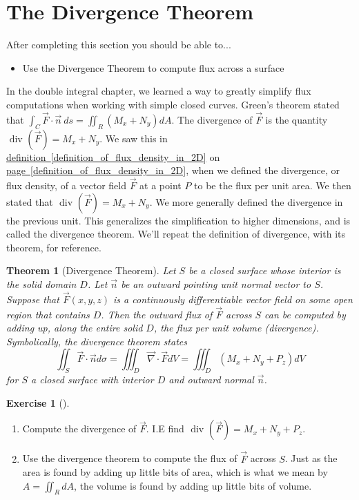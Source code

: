 \documentclass[10pt,]{book}
\theoremstyle{plain}
\newtheorem{theorem}{Theorem}[section]
\theoremstyle{definition}
\theoremstyle{definition}
\theoremstyle{definition}
\theoremstyle{definition}
\newtheorem{exploration}[project]{Exercise}
\theoremstyle{definition}
\numberwithin{equation}{section}
\begin{document}
\section[{The Divergence Theorem}]{The Divergence Theorem}\label{section-47}
After completing this section you should be able to... \leavevmode%
\begin{itemize}[label=\textbullet]
\item{}Use the Divergence Theorem to compute flux across a surface%
\end{itemize}
%
\par
In the double integral chapter, we learned a way to greatly simplify flux computations when working with simple closed curves. Green's theorem stated that \(\int_C \vec F\cdot \vec n\ ds = \iint_R (M_x+N_y) dA\). The divergence of \(\vec F\) is the quantity \(\text{ div } (\vec F) = M_x+N_y\). We saw this in \hyperref[definition_of_flux_density_in_2D]{definition~\ref{definition_of_flux_density_in_2D}} on \hyperref[definition_of_flux_density_in_2D]{page~\ref{definition_of_flux_density_in_2D}}, when we defined the divergence, or flux density, of a vector field \(\vec F\) at a point \(P\) to be the flux per unit area. We then stated that \(\text{ div } (\vec F)=M_x+N_y\). We more generally defined the divergence in the previous unit. This generalizes the simplification to higher dimensions, and is called the divergence theorem. We'll repeat the definition of divergence, with its theorem, for reference.%
\begin{theorem}[{Divergence Theorem}]\label{theorem-15}
Let \(S\) be a closed surface whose interior is the solid domain \(D\). Let \(\vec n\) be an outward pointing unit normal vector to \(S\). Suppose that \(\vec F(x,y,z)\) is a continuously differentiable vector field on some open region that contains \(D\). Then the outward flux of \(\vec F\) across \(S\) can be computed by adding up, along the entire solid \(D\), the flux per unit volume (divergence). Symbolically, the divergence theorem states%
\begin{equation*}
\iint_S\vec F\cdot \vec n d\sigma =  \iiint_D \vec \nabla \cdot \vec F dV = \iiint_D \left(M_x+N_y+P_z\right) dV
\end{equation*}
for \(S\) a closed surface with interior \(D\) and outward normal \(\vec n\).%
\end{theorem}
\begin{exploration}[]\label{exploration-309}
\leavevmode%
\begin{enumerate}[font=\bfseries,label=(\alph*),ref=\alph*]
\item\label{task-839} Compute the divergence of \(\vec F\). I.E find \(\text{ div } (\vec F) = M_x+N_y+P_z\).%
\item\label{task-840} Use the divergence theorem to compute the flux of \(\vec F\) across \(S\). Just as the area is found by adding up little bits of area, which is what we mean by \(A=\iint_R dA\), the volume is found by adding up little bits of volume.%
%
\end{enumerate}
\end{exploration}
\end{document}
